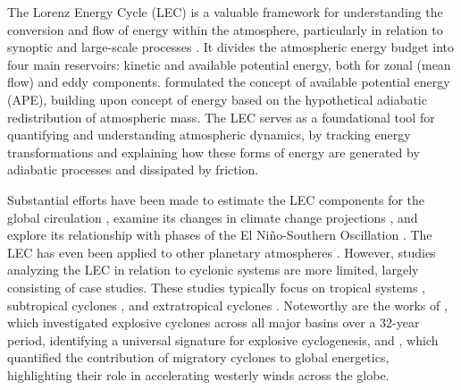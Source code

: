 \documentclass[pdflatex,sn-chicago]{sn-jnl}%
\theoremstyle{plain}
\theoremstyle{definition}
\theoremstyle{remark}
\theoremstyle{definition}
\begin{document}
The Lorenz Energy Cycle (LEC) is a valuable framework for understanding the conversion and flow of energy within the atmosphere, particularly in relation to synoptic and large-scale processes \citep{lorenz1967nature}. It divides the atmospheric energy budget into four main reservoirs: kinetic and available potential energy, both for zonal (mean flow) and eddy components. \citet{lorenz1955available} formulated the concept of available potential energy (APE), building upon \citet{margules1903energie} concept of energy based on the hypothetical adiabatic redistribution of atmospheric mass. The LEC serves as a foundational tool for quantifying and understanding atmospheric dynamics, by tracking energy transformations and explaining how these forms of energy are generated by adiabatic processes and dissipated by friction.

Substantial efforts have been made to estimate the LEC components for the global circulation \citep[e.g.][]{muench1965dynamics,wiin1968intensity,hu2004variations,li2007lorenz,oort2018estimates}, examine its changes in climate change projections \citep[e.g.][]{hernandez2010energetics,veiga2013global,pan2017earth,michaelides2021lorenz}, and explore its relationship with phases of the El Niño-Southern Oscillation \citep{gutierrez2009multivariate}. The LEC has even been applied to other planetary atmospheres \citep[e.g.][]{read2020baroclinic}. However, studies analyzing the LEC in relation to cyclonic systems are more limited, largely consisting of case studies. These studies typically focus on tropical systems \citep{brennan1980zonal,veiga2008analysis}, subtropical cyclones \citep{michaelides1987limited, dias2013synoptic, pezza2014large, cavicchia2018energetics}, and extratropical cyclones \citep{michaelides1992spatial, wahab2002mechanism, bulic2006limited,pezza2010environmental, dias2011energy}. Noteworthy are the works of \citet{black2013universal}, which investigated explosive cyclones across all major basins over a 32-year period, identifying a universal signature for explosive cyclogenesis, and \citet{okajima2021cyclonic}, which quantified the contribution of migratory cyclones to global energetics, highlighting their role in accelerating westerly winds across the globe.
\end{document}
